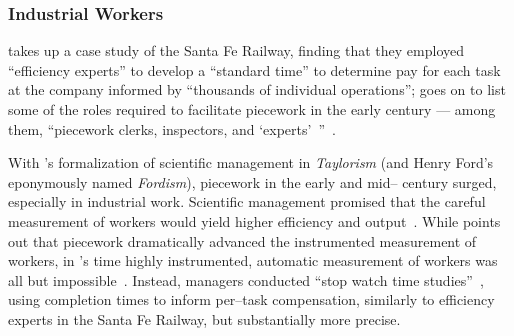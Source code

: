 \documentclass[trackingWork]{subfiles}
\begin{document}
\subsubsection{Industrial Workers}
\citeauthor{10.2307/23702539} takes up a case study of the Santa Fe Railway,
finding that they employed ``efficiency experts'' to develop a ``standard time''
to determine pay for each task at the company informed by
``thousands of individual operations''; %
\citeauthor{10.2307/23702539} goes on to list
some of the roles required to facilitate piecework
in the early  century
--- among them, ``piecework clerks, inspectors, and `experts'~''~\cite{10.2307/23702539}.

With \citeauthor{taylor1914principles}'s formalization of scientific management in \textit{Taylorism}
(and Henry Ford's eponymously named \textit{Fordism}),
piecework in the early and mid-- century surged, especially in industrial work.
Scientific management promised that the careful measurement of workers would yield
higher efficiency and output~\cite{taylor1914principles,towardsGlobalFordism}.
While \citeauthor{Brown01041990} points out that
piecework dramatically advanced the instrumented measurement of workers,
in \citeauthor{taylor1914principles}'s time highly instrumented,
automatic measurement of workers was all but impossible~\cite{Brown01041990}.
Instead, managers conducted ``stop watch time studies''~\cite{nadworny1955scientific},
using completion times to inform per--task compensation,
similarly to efficiency experts in the Santa Fe Railway, but
substantially more precise.
\end{document}
